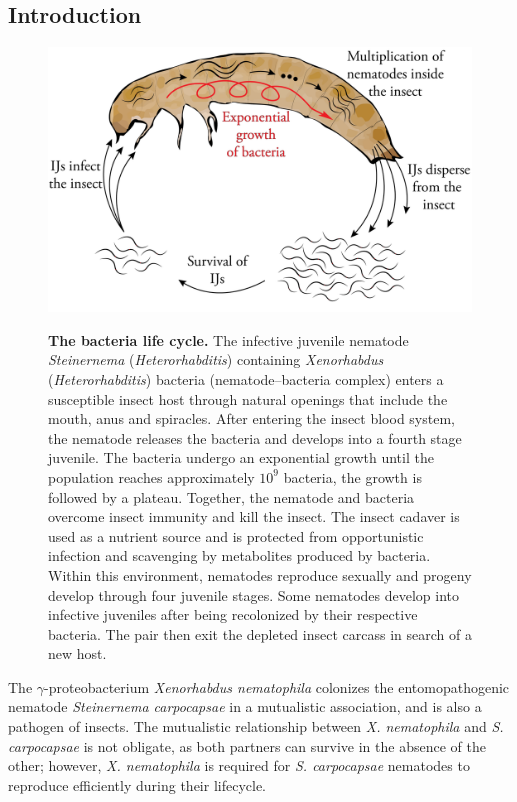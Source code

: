 \documentclass[10pt]{article}
\newcommand{\Xnema}{\textit{X. nematophila} }
\newcommand{\Scarpo}{\textit{S. carpocapsae} }
\newcommand{\Xenonema}{\textit{Xenorhabdus nematophila} }
\newcommand{\Steincarpo}{\textit{Steinernema carpocapsae} }
\newcommand{\Xeno}{\textit{Xenorhabdus} }
\newcommand{\Stein}{\textit{Steinernema} }
\begin{document}
\begin{multicols}{2}
\section*{Introduction}
\begin{figure}[hbt!]
	  \centering
	  \label{fig:life_cycle}
       \includegraphics[width=14.0cm]{Figures/life_cycle.png}\\
		\caption{ \textbf{The bacteria life cycle.} The infective juvenile nematode \Stein (\textit{Heterorhabditis}) containing \Xeno (\textit{Heterorhabditis}) bacteria (nematode–bacteria complex) enters a susceptible insect host through natural openings that include the mouth, anus and spiracles. After entering the insect blood system, the nematode releases the bacteria and develops into a fourth stage juvenile. The bacteria undergo an exponential growth until the population reaches approximately $10^9$ bacteria, the growth is followed by a plateau. Together, the nematode and bacteria overcome insect immunity and kill the insect. The insect cadaver is used as a nutrient source and is protected from opportunistic infection and scavenging by metabolites produced by bacteria. Within this environment, nematodes reproduce sexually and progeny develop through four juvenile stages. Some nematodes develop into infective juveniles after being recolonized by their respective bacteria. The pair then exit the depleted insect carcass in search of a new host.}
\end{figure}
The $\gamma$-proteobacterium \Xenonema colonizes the entomopathogenic nematode \Steincarpo in a mutualistic association, and is also a pathogen of insects. 
The mutualistic relationship between \Xnema and \Scarpo is not obligate, as both partners can survive in the absence of the other; however, \Xnema is required for \Scarpo nematodes to reproduce efficiently during their lifecycle. 

\end{multicols}
\end{document}
